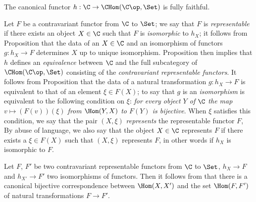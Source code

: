 \begin{proposition}[8.1.7]
\label{0.8.1.7}
The canonical functor $h:\C\to\CHom(\C\op,\Set)$ is fully faithful.
\end{proposition}

\begin{env}[8.1.8]
\label{0.8.1.8}
Let $F$ be a contravariant functor from $\C$ to $\Set$; we say that $F$ is \emph{representable} if there
exists an object $X\in\C$ such that $F$ is \emph{isomorphic} to $h_X$; it follows from
Proposition  that the data of an $X\in\C$ and an isomorphism of functors
$g:h_X\to F$ determines $X$ up to unique isomorphism. Proposition  then
implies that $h$ defines an \emph{equivalence} between $\C$ and the full subcategory of
$\CHom(\C\op,\Set)$ consisting of the \emph{contravariant representable functors}. It follows from
Proposition  that the data of a natural transformation $g:h_X\to F$ is
equivalent to that of an element $\xi\in F(X)$; to say that $g$ is an \emph{isomorphism} is
equivalent to the following condition on $\xi$: \emph{for every object $Y$ of $\C$ the map
$v\mapsto(F(v))(\xi)$ from $\Hom(Y,X)$ to $F(Y)$ is bijective}. When $\xi$ satisfies this condition,
we say that the pair $(X,\xi)$ \emph{represents} the representable functor $F$, By abuse of language,
we also say that the object $X\in\C$ represents $F$ if there exists a $\xi\in F(X)$ such that
$(X,\xi)$ represents $F$, in other words if $h_X$ is isomorphic to $F$.

Let $F$, $F'$ be two contravariant representable functors from $\C$ to $\Set$, $h_X\to F$ and
$h_{X'}\to F'$ two isomorphisms of functors. Then it follows from  that
there is a canonical bijective correspondence between $\Hom(X,X')$ and the set $\Hom(F,F')$ of
natural transformations $F\to F'$.
\end{env}

